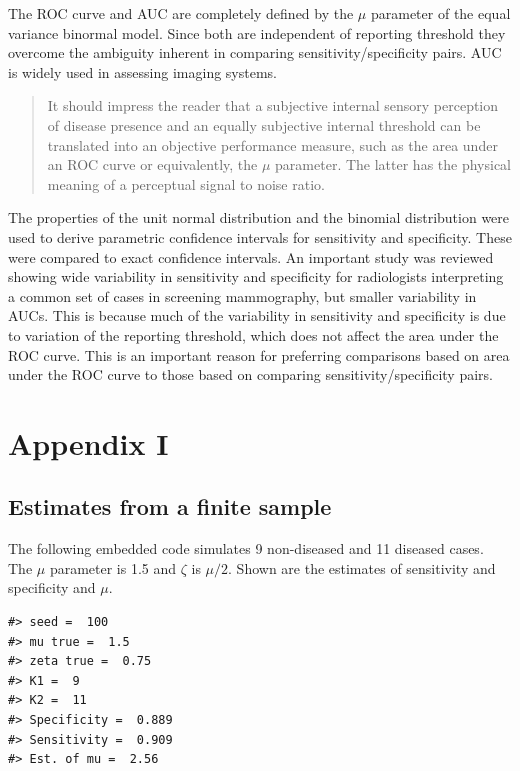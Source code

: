 \documentclass[
]{book}
\begin{document}
The ROC curve and AUC are completely defined by the \(\mu\) parameter of the equal variance binormal model. Since both are independent of reporting threshold they overcome the ambiguity inherent in comparing sensitivity/specificity pairs. AUC is widely used in assessing imaging systems.

\begin{quote}
It should impress the reader that a subjective internal sensory perception of disease presence and an equally subjective internal threshold can be translated into an objective performance measure, such as the area under an ROC curve or equivalently, the \(\mu\) parameter. The latter has the physical meaning of a perceptual signal to noise ratio.
\end{quote}

The properties of the unit normal distribution and the binomial distribution were used to derive parametric confidence intervals for sensitivity and specificity. These were compared to exact confidence intervals. An important study was reviewed showing wide variability in sensitivity and specificity for radiologists interpreting a common set of cases in screening mammography, but smaller variability in AUCs. This is because much of the variability in sensitivity and specificity is due to variation of the reporting threshold, which does not affect the area under the ROC curve. This is an important reason for preferring comparisons based on area under the ROC curve to those based on comparing sensitivity/specificity pairs.

\hypertarget{binary-task-model-demo}{%
\section{Appendix I}\label{binary-task-model-demo}}

\hypertarget{estimates-from-a-finite-sample}{%
\subsection{Estimates from a finite sample}\label{estimates-from-a-finite-sample}}

The following embedded code simulates 9 non-diseased and 11 diseased cases. The \(\mu\) parameter is 1.5 and \(\zeta\) is \(\mu/2\). Shown are the estimates of sensitivity and specificity and \(\mu\).

\begin{verbatim}
#> seed =  100 
#> mu true =  1.5 
#> zeta true =  0.75 
#> K1 =  9 
#> K2 =  11 
#> Specificity =  0.889 
#> Sensitivity =  0.909 
#> Est. of mu =  2.56
\end{verbatim}
\end{document}
